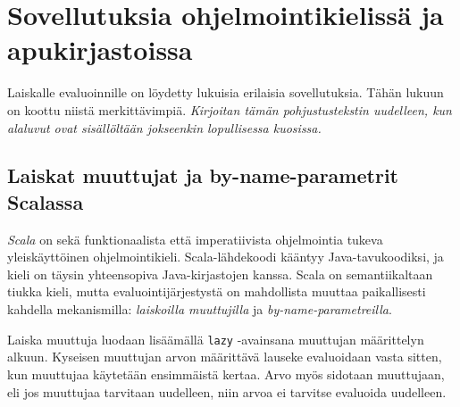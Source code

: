 
\clearpage
\section{Sovellutuksia ohjelmointikielissä ja apukirjastoissa}\label{sovellutuksia}

Laiskalle evaluoinnille on löydetty lukuisia erilaisia sovellutuksia. Tähän lukuun on koottu niistä merkittävimpiä. \textit{Kirjoitan tämän pohjustustekstin uudelleen, kun alaluvut ovat sisällöltään jokseenkin lopullisessa kuosissa.}

\subsection{Laiskat muuttujat ja by-name-parametrit Scalassa}

\textit{Scala} on sekä funktionaalista että imperatiivista ohjelmointia tukeva yleiskäyttöinen ohjelmointikieli. Scala-lähdekoodi kääntyy Java-tavukoodiksi, ja kieli on täysin yhteensopiva Java-kirjastojen kanssa. Scala on semantiikaltaan tiukka kieli, mutta evaluointijärjestystä on mahdollista muuttaa paikallisesti kahdella mekanismilla: \textit{laiskoilla muuttujilla} ja \textit{by-name-parametreilla}.

Laiska muuttuja luodaan lisäämällä \verb!lazy! -avainsana muuttujan määrittelyn alkuun. Kyseisen muuttujan arvon määrittävä lauseke evaluoidaan vasta sitten, kun muuttujaa käytetään ensimmäistä kertaa. Arvo myös sidotaan muuttujaan, eli jos muuttujaa tarvitaan uudelleen, niin arvoa ei tarvitse evaluoida uudelleen.

